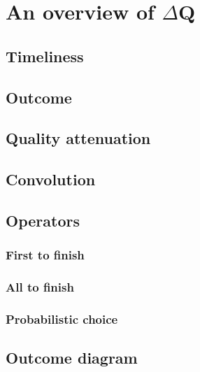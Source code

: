 \chapter{An overview of $\Delta$Q}
    \section{Timeliness}
    \section{Outcome}

    \section{Quality attenuation}
    \section{Convolution}
    \section{Operators}
        \subsection{First to finish}
        \subsection{All to finish}
        \subsection{Probabilistic choice}
    
    \section{Outcome diagram}
